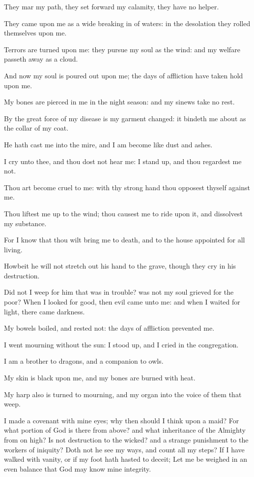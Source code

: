 \Verse They mar my path, they set forward my calamity, they have no helper.

\Verse They came upon me as a wide breaking in of waters: in the desolation they rolled themselves upon me.

\Verse Terrors are turned upon me: they pursue my soul as the wind: and my welfare passeth away as a cloud.

\Verse And now my soul is poured out upon me; the days of affliction have taken hold upon me.

\Verse My bones are pierced in me in the night season: and my sinews take no rest.

\Verse By the great force of my disease is my garment changed: it bindeth me about as the collar of my coat.

\Verse He hath cast me into the mire, and I am become like dust and ashes.

\Verse I cry unto thee, and thou dost not hear me: I stand up, and thou regardest me not.

\Verse Thou art become cruel to me: with thy strong hand thou opposest thyself against me.

\Verse Thou liftest me up to the wind; thou causest me to ride upon it, and dissolvest my substance.

\Verse For I know that thou wilt bring me to death, and to the house appointed for all living.

\Verse Howbeit he will not stretch out his hand to the grave, though they cry in his destruction.

\Verse Did not I weep for him that was in trouble? was not my soul grieved for the poor?  \Verse When I looked for good, then evil came unto me: and when I waited for light, there came darkness.

\Verse My bowels boiled, and rested not: the days of affliction prevented me.

\Verse I went mourning without the sun: I stood up, and I cried in the congregation.

\Verse I am a brother to dragons, and a companion to owls.

\Verse My skin is black upon me, and my bones are burned with heat.

\Verse My harp also is turned to mourning, and my organ into the voice of them that weep.


\Chapter
\Verse I made a covenant with mine eyes; why then should I think upon a maid?  \Verse For what portion of God is there from above? and what inheritance of the Almighty from on high?  \Verse Is not destruction to the wicked? and a strange punishment to the workers of iniquity?  \Verse Doth not he see my ways, and count all my steps?  \Verse If I have walked with vanity, or if my foot hath hasted to deceit; \Verse Let me be weighed in an even balance that God may know mine integrity.

